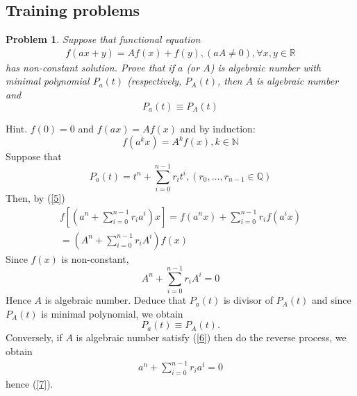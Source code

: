 \documentclass{article}
\newtheorem{problem}{Problem}
\begin{document}
\subsection{Training problems}

\begin{problem}
	Suppose that functional equation
	\begin{align}
		f\left( {ax + y} \right) = Af\left( x \right) + f\left( y \right),\left( {aA \ne 0} \right),\forall x,y \in \mathbb{R}
	\end{align}
	has non-constant solution. Prove that if $a$ (or $A$) is algebraic number with minimal polynomial $P_a(t)$ (respectively, $P_A(t)$, then $A$ is algebraic number and
	\begin{equation}
		\label{7}
		{P_a}\left( t \right) \equiv {P_A}\left( t \right)
	\end{equation}
\end{problem}
{\sf Hint.} $f(0)=0$ and $f(ax)=Af(x)$ and by induction:
\begin{equation}
	\label{5}
	f\left( {{a^k}x} \right) = {A^k}f\left( x \right),k \in \mathbb{N}
\end{equation}
Suppose that
\begin{equation}
	{P_a}\left( t \right) = {t^n} + \sum\limits_{i = 0}^{n - 1} {{r_i}{t^i},\left( {{r_0}, \ldots ,{r_{n - 1}} \in \mathbb{Q}} \right)} 
\end{equation}
Then, by (\ref{5})
\begin{align}
	f\left[ {\left( {{a^n} + \sum\limits_{i = 0}^{n - 1} {{r_i}{a^i}} } \right)x} \right] = f\left( {{a^n}x} \right) + \sum\limits_{i = 0}^{n - 1} {{r_i}f\left( {{a^i}x} \right)} \\
	= \left( {{A^n} + \sum\limits_{i = 0}^{n - 1} {{r_i}{A^i}} } \right)f\left( x \right)
\end{align}
Since $f(x)$ is non-constant, 
\begin{equation}
	\label{6}
	{A^n} + \sum\limits_{i = 0}^{n - 1} {{r_i}{A^i}}  = 0
\end{equation}
Hence $A$ is algebraic number. Deduce that $P_a(t)$ is divisor of $P_A(t)$ and since $P_A(t)$ is minimal polynomial, we obtain
\begin{equation}
	{P_a}\left( t \right) \equiv {P_A}\left( t \right).
\end{equation}
Conversely, if $A$ is algebraic number satisfy (\ref{6}) then do the reverse process, we obtain
\begin{align}
	{a^n} + \sum\limits_{i = 0}^{n - 1} {{r_i}{a^i}}  = 0
\end{align}
hence (\ref{7}).
\end{document}
